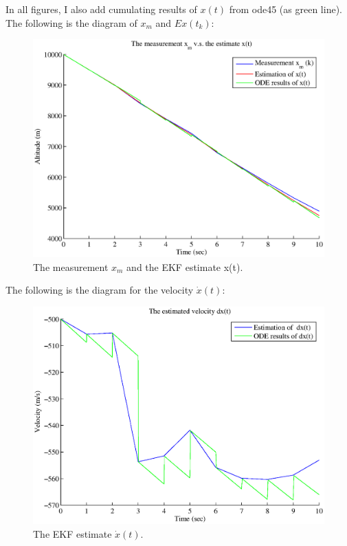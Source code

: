 \documentclass{article}
\begin{document}
In all figures, I also add cumulating results of $x(t)$ from ode45 (as green line).
The following is the diagram of $x_m$ and $E{x(t_k)}$:
\begin{figure}[H]
\begin{center}
\includegraphics[width=\textwidth]{hw6_xmxt.eps}
\caption{The measurement $x_m$ and the EKF estimate x(t).}
\end{center}
\end{figure} 
\pagebreak 
The following is the diagram for the velocity $\dot{x}(t)$:
\begin{figure}[H]
\begin{center}
\includegraphics[width=\textwidth]{hw6_dx.eps}
\caption{ The EKF estimate $\dot{x}(t)$.}
\end{center}
\end{figure} 
\end{document}
